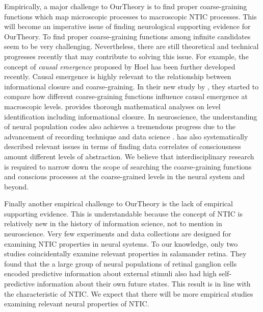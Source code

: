 \documentclass[utf8]{article}
\begin{document}
        
        Empirically, a major challenge to \ac{OurTheory} is to find proper coarse-graining functions which map microscopic processes to macroscopic NTIC processes. This will become an imperative issue of finding neurological supporting evidence for \ac{OurTheory}. To find proper coarse-graining functions among infinite candidates \citep{price2007causation} seem to be very challenging. Nevertheless, there are still theoretical and technical progresses recently that may contribute to  solving this issue. For example, the concept of \textit{causal emergence} proposed by Hoel \citep{Hoel19790, Hoel2018} has been further developed recently. Causal emergence is highly relevant to the relationship between informational closure and coarse-graining. In their new study by \cite{klein2019uncertainty}, they started to compare how different coarse-graining functions influence causal emergence at macroscopic levels. \cite{PFANTE.2014, PFANTE.2014b} provides thorough mathematical analyses on level identification including informational closure. In neuroscience, the understanding of neural population codes also achieves a tremendous progress due to the advancement of recording technique and data science \citep{Kohn2016, panzeri2015neural}. \cite{Gamez2016} has also systematically described relevant issues in terms of finding data correlates of consciousness amount different levels of abstraction. We believe that interdisciplinary research is required to narrow down the scope of searching the coarse-graining functions and conscious processes at the coarse-grained levels in the neural system and beyond. 
        
        Finally another empirical challenge to \ac{OurTheory} is the lack of empirical supporting evidence. This is understandable because the concept of NTIC is relatively new in the history of information science, not to mention in neuroscience. Very few experiments and data collections are designed for examining NTIC properties in neural systems. To our knowledge, only two studies \citep{Palmer2015, sederberg2018learning} coincidentally examine relevant properties in salamander retina. They found that the a large group of neural populations of retinal ganglion cells encoded predictive information about external stimuli also had high self-predictive information about their own future states. This result is in line with the characteristic of NTIC. We expect that there will be more empirical studies examining relevant neural properties of NTIC. 
\end{document}
